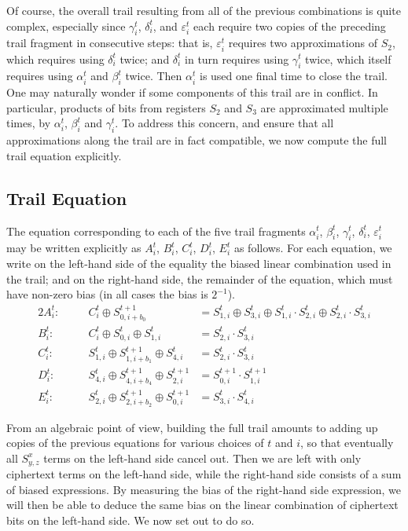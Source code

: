 Of course, the overall trail resulting from all of the previous combinations is quite complex, especially since $\gamma^t_i$, $\delta^t_i$, and $\varepsilon^t_i$ each require two copies of the preceding trail fragment in consecutive steps: that is, $\varepsilon^t_i$ requires two approximations of $S_2$, which requires using $\delta^t_i$ twice; and $\delta^t_i$ in turn requires using $\gamma^t_i$ twice, which itself requires using $\alpha^t_i$ and $\beta^t_i$ twice. Then $\alpha^t_i$ is used one final time to close the trail. One may naturally wonder if some components of this trail are in conflict. In particular, products of bits from registers $S_2$ and $S_3$ are approximated multiple times, by $\alpha^t_i$, $\beta^t_i$ and $\gamma^t_i$. To address this concern, and ensure that all approximations along the trail are in fact compatible, we now compute the full trail equation explicitly.

\subsection{Trail Equation}
\label{sec:minitraileq}

The equation corresponding to each of the five trail fragments $\alpha^t_i$, $\beta^t_i$, $\gamma^t_i$, $\delta^t_i$, $\varepsilon^t_i$ may be written explicitly as $A^t_i$, $B^t_i$, $C^t_i$, $D^t_i$, $E^t_i$ as follows. For each equation, we write on the left-hand side of the equality the biased linear combination used in the trail; and on the right-hand side, the remainder of the equation, which must have non-zero bias (in all cases the bias is $2^{-1}$).
\begin{alignat*}{2}
A^t_i:\quad&& C^t_i \oplus S^{t+1}_{0,i+b_0} &= S^t_{1,i} \oplus S^t_{3,i} \oplus S^t_{1,i} \cdot S^t_{2,i} \oplus S^t_{2,i} \cdot S^t_{3,i}\\
B^t_i:\quad&& C^t_i \oplus S^t_{0,i} \oplus S^t_{1,i} &= S^t_{2,i} \cdot S^t_{3,i} \\
C^t_i:\quad&& S^t_{1,i} \oplus S^{t+1}_{1,i+b_1} \oplus S^t_{4,i} &= S^t_{2,i} \cdot S^t_{3,i}\\
D^t_i:\quad&& S^t_{4,i} \oplus S^{t+1}_{4,i+b_4} \oplus S^{t+1}_{2,i} &= S^{t+1}_{0,i} \cdot S^{t+1}_{1,i}\\
E^t_i:\quad&& S^t_{2,i} \oplus S^{t+1}_{2,i+b_2} \oplus S^{t+1}_{0,i} &= S^t_{3,i} \cdot S^t_{4,i}
\end{alignat*}

From an algebraic point of view, building the full trail amounts to adding up copies of the previous equations for various choices of $t$ and $i$, so that eventually all $S^x_{y,z}$ terms on the left-hand side cancel out. Then we are left with only ciphertext terms on the left-hand side, while the right-hand side consists of a sum of biased expressions. By measuring the bias of the right-hand side expression, we will then be able to deduce the same bias on the linear combination of ciphertext bits on the left-hand side. We now set out to do so.

